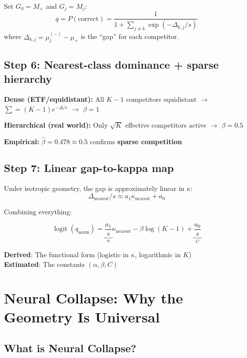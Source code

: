 \documentclass[11pt,a4paper]{article}
\DeclareMathOperator{\logit}{logit}
\begin{document}
Set $G_0 = M_+$ and $G_j = M_j$:
\[
q = P(\text{correct}) = \frac{1}{1 + \sum_{j \neq k} \exp(-\Delta_{k,j}/s)}
\]
where $\Delta_{k,j} = \mu_j^{(-)} - \mu_+$ is the ``gap'' for each competitor.

\subsection{Step 6: Nearest-class dominance + sparse hierarchy}

\begin{derivbox}
\textbf{Dense (ETF/equidistant):} All $K{-}1$ competitors equidistant $\to$ $\sum = (K{-}1)e^{-\Delta/s}$ $\to$ $\beta = 1$

\textbf{Hierarchical (real world):} Only $\sqrt{K}$ effective competitors active $\to$ $\beta = 0.5$

\textbf{Empirical:} $\hat\beta = 0.478 \approx 0.5$ confirms \textbf{sparse competition}
\end{derivbox}

\subsection{Step 7: Linear gap-to-kappa map}

Under isotropic geometry, the gap is approximately linear in $\kappa$:
\[
\Delta_{\mathrm{nearest}} / s \approx a_1 \kappa_\mathrm{nearest} + a_0
\]

Combining everything:
\begin{resultbox}
\vspace{-0.3cm}
\[
\logit(q_\mathrm{norm}) = \underbrace{\frac{a_1}{s}}_{\alpha} \kappa_\mathrm{nearest} - \beta\log(K{-}1) + \underbrace{\frac{a_0}{s}}_{C}
\]

\textbf{Derived}: The functional form (logistic in $\kappa$, logarithmic in $K$)\\
\textbf{Estimated}: The constants $(\alpha, \beta, C)$
\end{resultbox}

\section{Neural Collapse: Why the Geometry Is Universal}

\subsection{What is Neural Collapse?}
\end{document}
